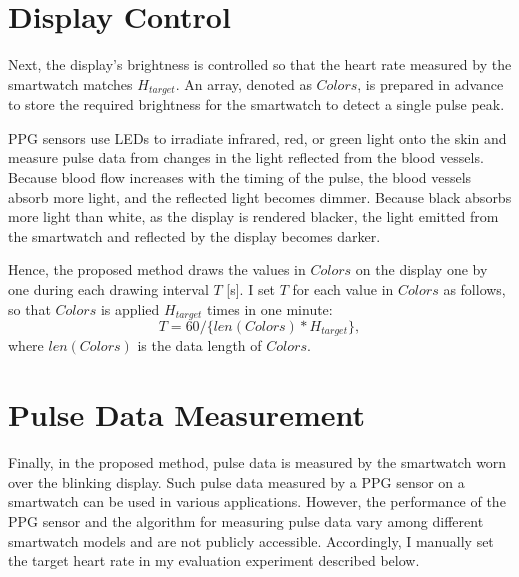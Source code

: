 \section{Display Control}
Next, the display's brightness is controlled so that the heart rate measured by the smartwatch matches $H_{target}$. An array, denoted as $Colors$, is prepared in advance to store the required brightness for the smartwatch to detect a single pulse peak.\par

PPG sensors use LEDs to irradiate infrared, red, or green light onto the skin and measure pulse data from changes in the light reflected from the blood vessels. Because blood flow increases with the timing of the pulse, the blood vessels absorb more light, and the reflected light becomes dimmer. Because black absorbs more light than white, as the display is rendered blacker, the light emitted from the smartwatch and reflected by the display becomes darker.\par

Hence, the proposed method draws the values in $Colors$ on the display one by one during each drawing interval $T$ [s]. I set $T$ for each value in $Colors$ as follows, so that $Colors$ is applied $H_{target}$ times in one minute:
\begin{equation}
  \label{eqn:wait}
  T = 60 / \{len(Colors) * H_{target}\},
\end{equation}
where $len(Colors)$ is the data length of $Colors$.


\section{Pulse Data Measurement}
Finally, in the proposed method, pulse data is measured by the smartwatch worn over the blinking display. Such pulse data measured by a PPG sensor on a smartwatch can be used in various applications. However, the performance of the PPG sensor and the algorithm for measuring pulse data vary among different smartwatch models and are not publicly accessible. Accordingly, I manually set the target heart rate in my evaluation experiment described below.

